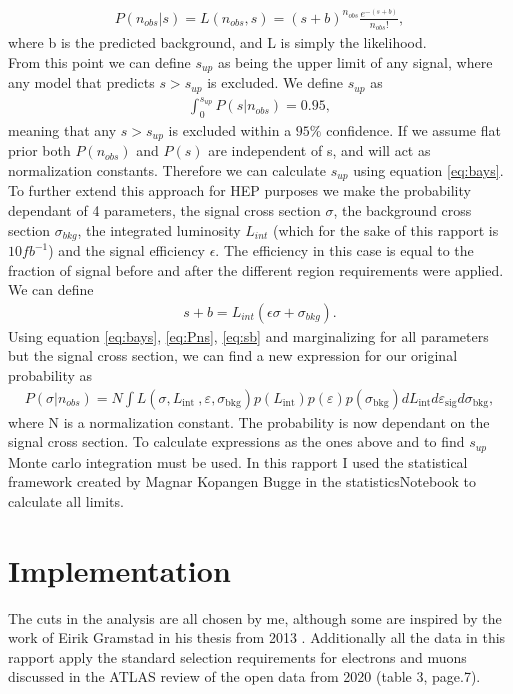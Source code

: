 \documentclass{article}
\begin{document}
\begin{align}\label{eq:Pns}
    P(n_{obs}|s) = L(n_{obs},s) = (s+b)^{n_{obs}} \frac{e^{-(s+b)}}{n_{obs}!},
\end{align}
where b is the predicted background, and L is simply the likelihood. 
\\
From this point we can define $s_{up}$ as being the upper limit of any signal, where any model that predicts $s>s_{up}$ is excluded. We define $s_{up}$ as
\begin{align}
    \int_0^{s_{up}} P(s|n_{obs})  = 0.95,
\end{align}
meaning that any $s>s_{up}$ is excluded within a $95\%$ confidence. If we assume flat prior both $P(n_{obs})$ and $P(s)$ are independent of s, and will act as normalization constants. Therefore we can calculate $s_{up}$ using equation \ref{eq:bays}. 
\\
To further extend this approach for HEP purposes we make the probability dependant of 4 parameters, the signal cross section $\sigma$, the background cross section $\sigma_{bkg}$,  the integrated luminosity $L_{int}$ (which for the sake of this rapport is $10fb^{-1}$) and the signal efficiency $\epsilon$. The efficiency in this case is equal to the fraction of signal before and after the different region requirements were applied. 
\\
We can define 
\begin{align}\label{eq:sb}
    s+b = L_{int} (\epsilon \sigma + \sigma_{bkg}).
\end{align}
Using equation \ref{eq:bays}, \ref{eq:Pns}, \ref{eq:sb} and marginalizing for all parameters but the signal cross section, we can find a new expression for our original probability as
\begin{align}
    P(\sigma | n_{obs}) =N \int L\left(\sigma, L_{\text {int }}, \varepsilon, \sigma_{\mathrm{bkg}}\right) p\left(L_{\mathrm{int}}\right) p\left(\varepsilon\right) p\left(\sigma_{\mathrm{bkg}}\right) d L_{\mathrm{int}} d \varepsilon_{\mathrm{sig}} d \sigma_{\mathrm{bkg}},
\end{align}
where N is a normalization constant. The probability is now dependant on the signal cross section. To calculate expressions as the ones above and to find $s_{up}$ Monte carlo integration must be used. In this rapport I used the statistical framework created by Magnar Kopangen Bugge in the statisticsNotebook to calculate all limits.
\section{Implementation}
The cuts in the analysis are all chosen by me, although some are inspired by the work of Eirik Gramstad in his thesis from 2013 \cite{Gramstad:2013loc}. Additionally all the data in this rapport apply the standard selection requirements for electrons and muons discussed in the ATLAS review of the open data from 2020 \cite{ATL-OREACH-PUB-2020-001} (table 3, page.7).
\end{document}
